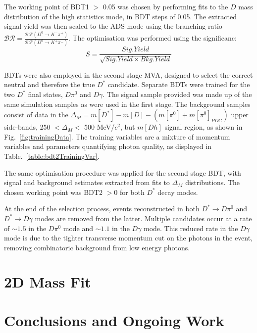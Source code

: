 \documentclass[oneside,12pt]{article}
\begin{document}
The working point of BDT1 $>$ 0.05 was chosen by performing fits to the $D$ mass
distribution of the high statistics mode, in BDT steps of 0.05. The extracted
signal yield was then scaled to the ADS mode using the branching ratio
$\mathcal{BR} = \frac{\mathcal{BF}(D^0 \rightarrow K^- \pi^+)}{\mathcal{BF}(D^0
\rightarrow K^+ \pi^-)}$. The optimisation was performed using the
significanc:
\begin{equation}
S = \frac{Sig. Yield}{\sqrt{Sig. Yield \times Bkg. Yield}}
\label{D_branching_ratio}
\end{equation}

BDTs were also employed in the second stage MVA, designed to select the correct
neutral and therefore the true $D^*$ candidate. Separate BDTs were trained for
the two $D^*$ final states, $D\pi^0$ and $D\gamma$. The signal sample provided
was made up of the same simulation samples as were used in the first stage. The
background samples consist of data in the $\Delta_M=m[D^{*}] - m[D]- (m[\pi^0]
+ m[\pi^0]_{PDG})$ upper side-bands, 250 $ < \Delta_{M} < $ 500 MeV/$c^2$, but
$m[Dh]$ signal region, as shown in Fig.~\ref{fig:trainingData}. The training
variables are a mixture of momentum variables and parameters quantifying photon
quality, as displayed in Table.~\ref{table:bdt2TrainingVar}. 

The same optimisation procedure was applied for the second stage BDT, with
signal and background estimates extracted from fits to $\Delta_M$
distributions. The chosen working point was BDT2 $>0$ for both $D^{*}$ decay modes.

At the end of the selection process, events reconstructed in both
$D^{*}\rightarrow D\pi^0$ and $D^{*}\rightarrow D\gamma$ modes are removed from
the latter. Multiple candidates occur at a rate of $\sim 1.5$ in the $D\pi^0$
mode and $\sim 1.1$ in the $D\gamma$ mode. This reduced rate in the $D\gamma$
mode is due to the tighter transverse momentum cut on the photons in the event,
removing combinatoric background from low energy photons.


\section{2D Mass Fit} \label{massfit}
\section{Conclusions and Ongoing Work} \label{conclusion}

\printbibliography[heading=bibintoc,{title=References}]
\end{document}
